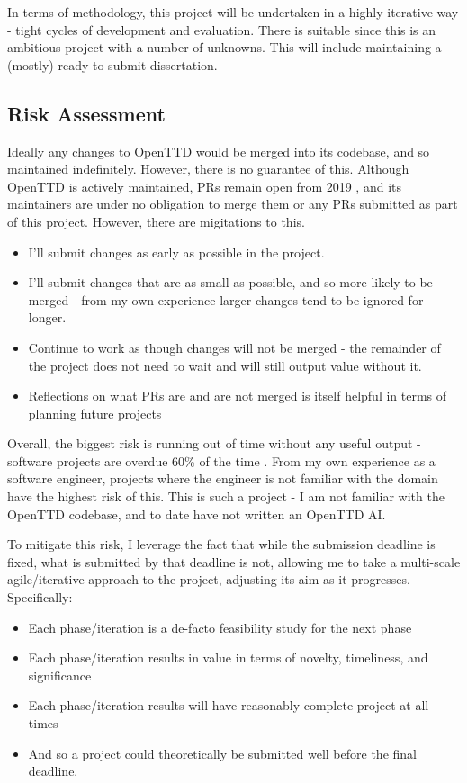 \documentclass[a4paper,11pt]{article}
\begin{document}
In terms of methodology, this project will be undertaken in a highly iterative way - tight cycles of development and evaluation. There is suitable since this is an ambitious project with a number of unknowns. This will include maintaining a (mostly) ready to submit dissertation.

\subsection{Risk Assessment}
\label{riskassessment}

Ideally any changes to OpenTTD would be merged into its codebase, and so maintained indefinitely. However, there is no guarantee of this. Although OpenTTD is actively maintained, PRs remain open from 2019 , and its maintainers are under no obligation to merge them or any PRs submitted as part of this project. However, there are migitations to this.

\begin{itemize}
    \item I'll submit changes as early as possible in the project.
    \item I'll submit changes that are as small as possible, and so more likely to be merged - from my own experience larger changes tend to be ignored for longer.
    \item Continue to work as though changes will not be merged - the remainder of the project does not need to wait and will still output value without it.
    \item Reflections on what PRs are and are not merged is itself helpful in terms of planning future projects
\end{itemize}

Overall, the biggest risk is running out of time without any useful output - software projects are overdue 60\% of the time \cite{chaos2015}. From my own experience as a software engineer, projects where the engineer is not familiar with the domain have the highest risk of this. This is such a project - I am not familiar with the OpenTTD codebase, and to date have not written an OpenTTD AI.

To mitigate this risk, I leverage the fact that while the submission deadline is fixed, what is submitted by that deadline is not, allowing me to take a multi-scale agile/iterative approach to the project, adjusting its aim as it progresses. Specifically:

\begin{itemize}
    \item Each phase/iteration is a de-facto feasibility study for the next phase
    \item Each phase/iteration results in value in terms of novelty, timeliness, and significance
    \item Each phase/iteration results will have reasonably complete project at all times
    \item And so a project could theoretically be submitted well before the final deadline.
\end{itemize}
\end{document}
